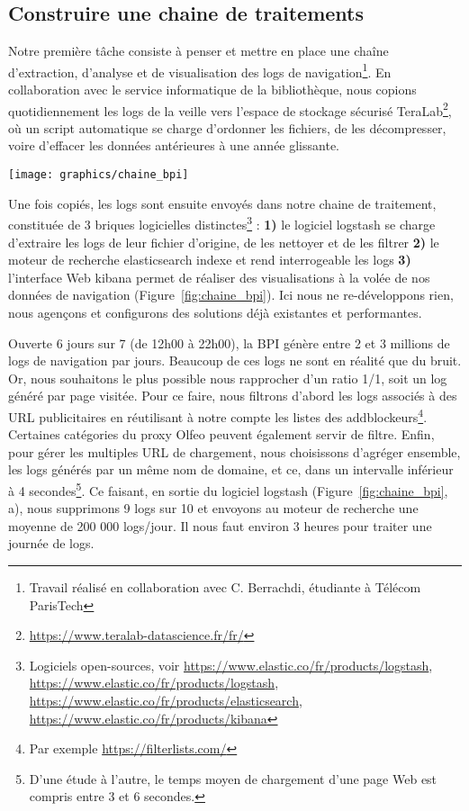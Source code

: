 \documentclass[symmetric,justified,marginals=raggedouter]{tufte-book}
\begin{document}
\subsection{Construire une chaine de traitements}

\noindent Notre première tâche consiste à penser et mettre en place une chaîne d'extraction, d'analyse et de visualisation des logs de navigation\footnote{\RaggedOuter Travail réalisé en collaboration avec C. Berrachdi, étudiante à Télécom ParisTech}. En collaboration avec le service informatique de la bibliothèque, nous copions quotidiennement les logs de la veille vers l'espace de stockage sécurisé TeraLab\footnote{\RaggedOuter \url{https://www.teralab-datascience.fr/fr/}}, où un script automatique se charge d'ordonner les fichiers, de les décompresser, voire d'effacer les données antérieures à une année glissante. 

\begin{figure*}
  \texttt{[image: graphics/chaine\_bpi]}
  \caption{Chaine de traitement des logs de navigation de la BPI}
  \label{fig:chaine_bpi}
\end{figure*}

\noindent Une fois copiés, les logs sont ensuite envoyés dans notre chaine de traitement, constituée de 3 briques logicielles distinctes\footnote{\RaggedOuter Logiciels open-sources, voir \url{https://www.elastic.co/fr/products/logstash}, \url{https://www.elastic.co/fr/products/logstash}, \url{https://www.elastic.co/fr/products/elasticsearch}, \url{https://www.elastic.co/fr/products/kibana}} : \textbf{1)} le logiciel logstash se charge d'extraire les logs de leur fichier d'origine, de les nettoyer et de les filtrer \textbf{2)} le moteur de recherche elasticsearch indexe et rend interrogeable les logs \textbf{3)} l'interface Web kibana permet de réaliser des visualisations à la volée de nos données de navigation (Figure~\ref{fig:chaine_bpi}). Ici nous ne re-développons rien, nous agençons et configurons des solutions déjà existantes et performantes. 

Ouverte 6 jours sur 7 (de 12h00 à 22h00), la BPI génère entre 2 et 3 millions de logs de navigation par jours. Beaucoup de ces logs ne sont en réalité que du bruit. Or, nous souhaitons le plus possible nous rapprocher d'un ratio 1/1, soit un log généré par page visitée. Pour ce faire, nous filtrons d'abord les logs associés à des URL publicitaires en réutilisant à notre compte les listes des addblockeurs\footnote{\RaggedOuter Par exemple \url{https://filterlists.com/}}. Certaines catégories du proxy Olfeo peuvent également servir de filtre. Enfin, pour gérer les multiples URL de chargement, nous choisissons d'agréger ensemble, les logs générés par un même nom de domaine, et ce, dans un intervalle inférieur à 4 secondes\footnote{\RaggedOuter D'une étude à l'autre, le temps moyen de chargement d'une page Web est compris entre 3 et 6 secondes.}. Ce faisant, en sortie du logiciel logstash (Figure~\ref{fig:chaine_bpi}, a), nous supprimons 9 logs sur 10 et envoyons au moteur de recherche une moyenne de 200 000 logs/jour. Il nous faut environ 3 heures pour traiter une journée de logs. 
\end{document}
